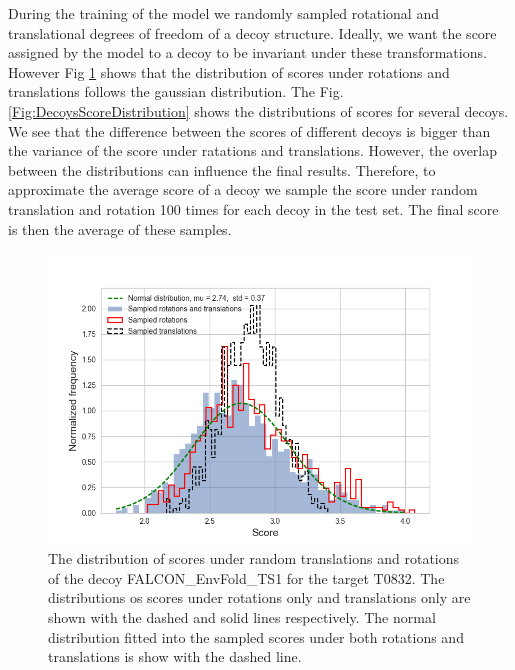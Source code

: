 During the training of the model we randomly sampled rotational and translational degrees of freedom of a decoy structure. Ideally, we 
want the score assigned by the model to a decoy to be invariant under these transformations. However Fig \ref{Fig:ScoreDistribution} 
shows that the distribution
of scores under rotations and translations follows the gaussian distribution. The Fig. \ref{Fig:DecoysScoreDistribution} 
shows the distributions of scores for several decoys. We see that the difference between the scores of different decoys is 
bigger than the variance of the score under ratations and translations. However, the overlap between 
the distributions can influence the final results. Therefore, to approximate the average score of a decoy we 
sample the score under random translation and rotation 100 times for each decoy in the test set. The final score is then the average of these 
samples.

\begin{figure}[H]
    \centering
    \includegraphics[width=\linewidth]{Fig/sampling_dist.png}
    \caption{The distribution of scores under random translations and rotations of the decoy 
    FALCON\_EnvFold\_TS1 for the target T0832. The distributions 
    os scores under rotations only and translations only are shown with the dashed and solid lines respectively.
    The normal distribution fitted into the sampled scores under both rotations and translations is show with the dashed line.
    }
    \label{Fig:ScoreDistribution}
\end{figure}

